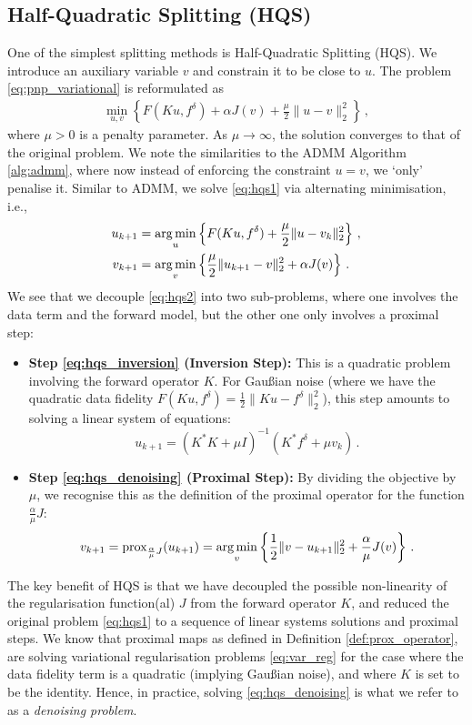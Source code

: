 \subsection{Half-Quadratic Splitting (HQS)}
One of the simplest splitting methods is Half-Quadratic Splitting (HQS). We introduce an auxiliary variable $v$ and constrain it to be close to $u$. The problem \eqref{eq:pnp_variational} is reformulated as
\begin{align}
    \min_{u, v} \left\{ F(Ku, f^\delta) + \alpha J(v) + \frac{\mu}{2} \|u - v\|_2^2 \right\} \, ,\label{eq:hqs1}
\end{align}
where $\mu > 0$ is a penalty parameter. As $\mu \to \infty$, the solution converges to that of the original problem. We note the similarities to the ADMM Algorithm \ref{alg:admm}, where now instead of enforcing the constraint $u = v$, we `only' penalise it. Similar to ADMM, we solve \eqref{eq:hqs1} via alternating minimisation, i.e.,
\begin{subequations}
\begin{align}
    u_{k+1} &= \operatorname*{arg\,min}_{u} \left\{ F(Ku, f^\delta) + \frac{\mu}{2} \|u - v_k\|_2^2 \right\} \, , \label{eq:hqs_inversion} \\
    v_{k+1} &= \operatorname*{arg\,min}_{v} \left\{ \frac{\mu}{2} \|u_{k+1} - v\|_2^2 + \alpha J(v) \right\} \, . \label{eq:hqs_denoising}
\end{align}\label{eq:hqs2}%
\end{subequations}
We see that we decouple \eqref{eq:hqs2} into two sub-problems, where one involves the data term and the forward model, but the other one only involves a proximal step: 
\begin{itemize}
    \item \textbf{Step \eqref{eq:hqs_inversion} (Inversion Step):} This is a quadratic problem involving the forward operator $K$. For Gau\ss ian noise (where we have the quadratic data fidelity $F(Ku, f^\delta) = \frac{1}{2}\|Ku - f^\delta\|_2^2$), this step amounts to solving a linear system of equations:
    \[ u_{k+1} = (K^*K + \mu I)^{-1} (K^*f^\delta + \mu v_k) \, . \]
    \item \textbf{Step \eqref{eq:hqs_denoising} (Proximal Step):} By dividing the objective by $\mu$, we recognise this as the definition of the proximal operator for the function $\frac{\alpha}{\mu} J$:
    \[ v_{k+1} = \operatorname{prox}_{\frac{\alpha}{\mu} J} (u_{k+1}) = \operatorname*{arg\,min}_{v} \left\{ \frac{1}{2} \|v - u_{k+1}\|_2^2 + \frac{\alpha}{\mu} J(v) \right\} \, . \]
\end{itemize}
The key benefit of HQS is that we have decoupled the possible non-linearity of the regularisation function(al) $J$ from the forward operator $K$, and reduced the original problem \eqref{eq:hqs1} to a sequence of linear systems solutions and proximal steps. We know that proximal maps as defined in Definition \ref{def:prox_operator}, are solving variational regularisation problems \eqref{eq:var_reg} for the case where the data fidelity term is a quadratic (implying Gau\ss ian noise), and where $K$ is set to be the identity. Hence, in practice, solving \eqref{eq:hqs_denoising} is what we refer to as a \emph{denoising problem}.

